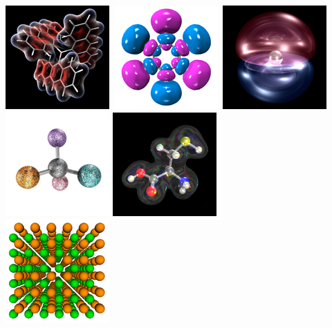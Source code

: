 \documentclass[a4paper,12pt]{article}
\begin{document}
\begin{center}
\includegraphics[scale=0.58]{figures/gallery/g1_sm.png}\
\includegraphics[scale=0.58]{figures/gallery/g4_sm.png}\
\includegraphics[scale=0.58]{figures/gallery/g23_sm.png}\
\includegraphics[scale=0.58]{figures/gallery/g26_sm.png}
\includegraphics[scale=0.58]{figures/gallery/g24_sm.png} \\
\includegraphics[scale=0.58]{figures/gallery/g7_sm.png}\

\end{center}
\end{document}
